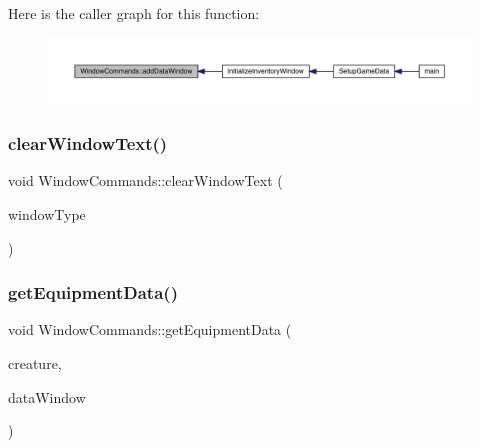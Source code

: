 Here is the caller graph for this function\+:
\nopagebreak
\begin{figure}[H]
\begin{center}
\leavevmode
\includegraphics[width=350pt]{class_window_commands_ace8d243ff05f6535d2c6fe5bff6e5517_icgraph}
\end{center}
\end{figure}
\mbox{\label{class_window_commands_a74006a8f056f99594930592069c36604}} 
\subsubsection{\texorpdfstring{clear\+Window\+Text()}{clearWindowText()}}
{\footnotesize\ttfamily void Window\+Commands\+::clear\+Window\+Text (\begin{DoxyParamCaption}\item[{\mbox{\hyperlink{_data_window_8hpp_a3c1e0c6fe947fdbea7502497b27cf44d}{En\+Data\+Window\+Type}}}]{window\+Type }\end{DoxyParamCaption})}

\mbox{\label{class_window_commands_a53ed484ce3096298bc7260c02015f5aa}} 
\subsubsection{\texorpdfstring{get\+Equipment\+Data()}{getEquipmentData()}}
{\footnotesize\ttfamily void Window\+Commands\+::get\+Equipment\+Data (\begin{DoxyParamCaption}\item[{\mbox{\hyperlink{class_base_creature}{Base\+Creature}} \&}]{creature,  }\item[{\mbox{\hyperlink{class_data_window}{Data\+Window}} \&}]{data\+Window }\end{DoxyParamCaption})}

